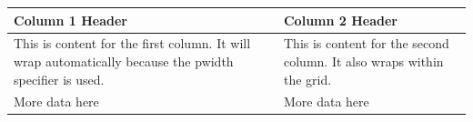 \documentclass{article}
\begin{document}
\begin{tabular}{|p{}|p{}|}
\hline
Column 1 Header & Column 2 Header \\
\hline
This is content for the first column. It will wrap automatically because the p{width} specifier is used. & This is content for the second column. It also wraps within the grid. \\
\hline
More data here & More data here \\
\hline
\end{tabular}
\end{document}
